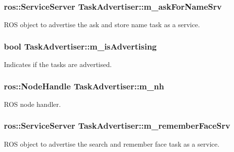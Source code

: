 \subsubsection[{\texorpdfstring{m\+\_\+ask\+For\+Name\+Srv}{m_askForNameSrv}}]{\setlength{\rightskip}{0pt plus 5cm}ros\+::\+Service\+Server Task\+Advertiser\+::m\+\_\+ask\+For\+Name\+Srv\hspace{0.3cm}{\ttfamily [private]}}\hypertarget{class_task_advertiser_a6413b132f00fc7aec17edd1b9d59c07b}{}\label{class_task_advertiser_a6413b132f00fc7aec17edd1b9d59c07b}
R\+OS object to advertise the ask and store name task as a service. 
\subsubsection[{\texorpdfstring{m\+\_\+is\+Advertising}{m_isAdvertising}}]{\setlength{\rightskip}{0pt plus 5cm}bool Task\+Advertiser\+::m\+\_\+is\+Advertising\hspace{0.3cm}{\ttfamily [private]}}\hypertarget{class_task_advertiser_a399c52352a5d0663074e03ad6ecae4c3}{}\label{class_task_advertiser_a399c52352a5d0663074e03ad6ecae4c3}
Indicates if the tasks are advertised. 
\subsubsection[{\texorpdfstring{m\+\_\+nh}{m_nh}}]{\setlength{\rightskip}{0pt plus 5cm}ros\+::\+Node\+Handle Task\+Advertiser\+::m\+\_\+nh\hspace{0.3cm}{\ttfamily [private]}}\hypertarget{class_task_advertiser_ac2b3e206897a243a661863c27fcf7e96}{}\label{class_task_advertiser_ac2b3e206897a243a661863c27fcf7e96}
R\+OS node handler. 
\subsubsection[{\texorpdfstring{m\+\_\+remember\+Face\+Srv}{m_rememberFaceSrv}}]{\setlength{\rightskip}{0pt plus 5cm}ros\+::\+Service\+Server Task\+Advertiser\+::m\+\_\+remember\+Face\+Srv\hspace{0.3cm}{\ttfamily [private]}}\hypertarget{class_task_advertiser_af4a9ec62d358dd0bfadc7f14ea56976c}{}\label{class_task_advertiser_af4a9ec62d358dd0bfadc7f14ea56976c}
R\+OS object to advertise the search and remember face task as a service. 
